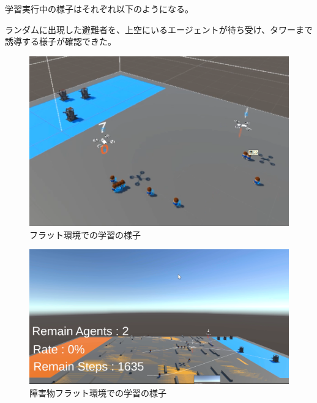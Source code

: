 \documentclass{article}[jsarticle]
\begin{document}
学習実行中の様子はそれぞれ以下のようになる。\par 
ランダムに出現した避難者を、上空にいるエージェントが待ち受け、タワーまで誘導する様子が確認できた。
\begin{figure}[H]
    \centering
    \includegraphics[scale=0.3]{./images/learning-1.png}
    \caption{
        フラット環境での学習の様子
    }
\end{figure}
\begin{figure}[H]
    \centering
    \includegraphics[scale=0.3]{./images/learning-2.png}
    \caption{
        障害物フラット環境での学習の様子
    }
\end{figure}
\end{document}
